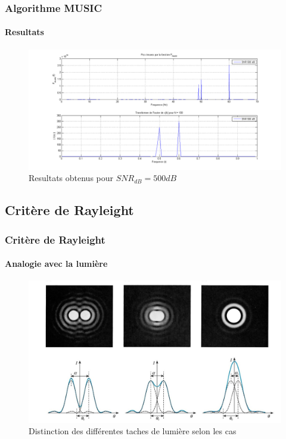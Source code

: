 \documentclass[10pt]{beamer}
\begin{document}
\begin{frame}
%
\frametitle{Algorithme MUSIC}
\framesubtitle{Resultats}

\begin{figure}[h]
\centering
\includegraphics[scale= 0.28]{images/snr500}
\caption{Resultats obtenus pour \(SNR_{dB} = 500 dB\)}
\label{fig:wave500}
\end{figure}

\end{frame}


\subsection{Critère de Rayleight}
\begin{frame}
%
\frametitle{Critère de Rayleight}
\framesubtitle{Analogie avec la lumière}

\begin{figure}[h]
\centering
\includegraphics[scale= 0.22]{images/Critere_Rayleight2}
\caption{Distinction des différentes taches de lumière selon les cas}
\end{figure}

\end{frame}
\end{document}
